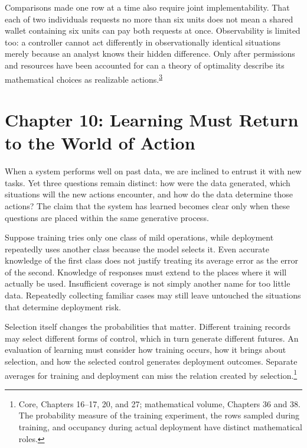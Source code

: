 \documentclass[
  english,
  11pt,
  oneside]{book}
\begin{document}
\begingroup{}

Comparisons made one row at a time also require joint implementability. That each of two individuals requests no more than six units does not mean a shared wallet containing six units can pay both requests at once. Observability is limited too: a controller cannot act differently in observationally identical situations merely because an analyst knows their hidden difference. Only after permissions and resources have been accounted for can a theory of optimality describe its mathematical choices as realizable actions.\textsuperscript{\hyperlink{ph-note-3}{3}}

\par\endgroup

\chapter{Chapter 10: Learning Must Return to the World of Action}\label{ph-ch-10}

When a system performs well on past data, we are inclined to entrust it with new tasks. Yet three questions remain distinct: how were the data generated, which situations will the new actions encounter, and how do the data determine those actions? The claim that the system has learned becomes clear only when these questions are placed within the same generative process.

Suppose training tries only one class of mild operations, while deployment repeatedly uses another class because the model selects it. Even accurate knowledge of the first class does not justify treating its average error as the error of the second. Knowledge of responses must extend to the places where it will actually be used. Insufficient coverage is not simply another name for too little data. Repeatedly collecting familiar cases may still leave untouched the situations that determine deployment risk.

Selection itself changes the probabilities that matter. Different training records may select different forms of control, which in turn generate different futures. An evaluation of learning must consider how training occurs, how it brings about selection, and how the selected control generates deployment outcomes. Separate averages for training and deployment can miss the relation created by selection.\footnote{\hypertarget{ph-note-24}{}Core, Chapters 16--17, 20, and 27; mathematical volume, Chapters 36 and 38. The probability measure of the training experiment, the rows sampled during training, and occupancy during actual deployment have distinct mathematical roles.}
\end{document}
